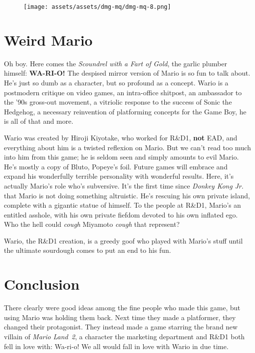 \documentclass{book}
\begin{document}
\begin{figure}[hbt]
\vskip 10pt
\centering \texttt{[image: assets/assets/dmg-mq/dmg-mq-8.png]}
\vskip 6pt
\end{figure}

\FloatBarrier\needspace{5pt}\section*{Weird Mario}\nopagebreak[4]

Oh boy. Here comes the \emph{Scoundrel with a Fart of Gold}, the garlic plumber himself: \textbf{WA-RI-O!} The despised mirror version of Mario is so fun to talk about. He’s just so dumb as a character, but so profound as a concept. Wario is a postmodern critique on video games, an intra-office shitpost, an ambassador to the ’90s gross-out movement, a vitriolic response to the success of Sonic the Hedgehog, a necessary reinvention of platforming concepts for the Game Boy, he is all of that and more.

Wario was created by Hiroji Kiyotake, who worked for R\&D1, \textbf{not} EAD, and everything about him is a twisted reflexion on Mario. But we can’t read too much into him from this game; he is seldom seen and simply amounts to evil Mario. He’s mostly a copy of Bluto, Popeye’s foil. Future games will embrace and expand his wonderfully terrible personality with wonderful results. Here, it’s actually Mario’s role who’s subversive. It’s the first time since \emph{Donkey Kong Jr.} that Mario is not doing something altruistic. He’s rescuing his own private island, complete with a gigantic statue of himself. To the people at R\&D1, Mario’s an entitled asshole, with his own private fiefdom devoted to his own inflated ego. Who the hell could \emph{cough} Miyamoto \emph{cough} that represent?

Wario, the R\&D1 creation, is a greedy goof who played with Mario’s stuff until the ultimate sourdough comes to put an end to his fun.

\FloatBarrier\needspace{5pt}\section*{Conclusion}\nopagebreak[4]

There clearly were good ideas among the fine people who made this game, but using Mario was holding them back. Next time they made a platformer, they changed their protagonist. They instead made a game starring the brand new villain of \emph{Mario Land 2}, a character the marketing department and R\&D1 both fell in love with: Wa-ri-o! We all would fall in love with Wario in due time.
\end{document}
